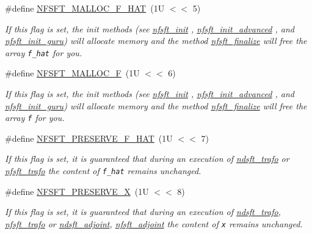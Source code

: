 \begin{CompactItemize}
\#define \hyperlink{group__nfsft_gb76dcf8db948f18cc87403dac804fc68}{NFSFT\_\-MALLOC\_\-F\_\-HAT}~(1U $<$$<$ 5)
\begin{CompactList}\small\item\em If this flag is set, the init methods (see \hyperlink{group__nfsft_g65cda3f4a3edc5eb39c697cf34b1f0b9}{nfsft\_\-init} , \hyperlink{group__nfsft_ge7dca3e41afdb39e8c518af414878c18}{nfsft\_\-init\_\-advanced} , and \hyperlink{group__nfsft_g60466ed37643b6b7b7c1638056604d2b}{nfsft\_\-init\_\-guru}) will allocate memory and the method \hyperlink{group__nfsft_ga63e193a27d84059742ff25ff81e2ed1}{nfsft\_\-finalize} will free the array {\tt f\_\-hat} for you. \item\end{CompactList}\item 
\#define \hyperlink{group__nfsft_gf3bc3ab774cda0c1c765e97066893d30}{NFSFT\_\-MALLOC\_\-F}~(1U $<$$<$ 6)
\begin{CompactList}\small\item\em If this flag is set, the init methods (see \hyperlink{group__nfsft_g65cda3f4a3edc5eb39c697cf34b1f0b9}{nfsft\_\-init} , \hyperlink{group__nfsft_ge7dca3e41afdb39e8c518af414878c18}{nfsft\_\-init\_\-advanced} , and \hyperlink{group__nfsft_g60466ed37643b6b7b7c1638056604d2b}{nfsft\_\-init\_\-guru}) will allocate memory and the method \hyperlink{group__nfsft_ga63e193a27d84059742ff25ff81e2ed1}{nfsft\_\-finalize} will free the array {\tt f} for you. \item\end{CompactList}\item 
\#define \hyperlink{group__nfsft_gc8a292845f0bdec6b0d8ef6eb693a00e}{NFSFT\_\-PRESERVE\_\-F\_\-HAT}~(1U $<$$<$ 7)
\begin{CompactList}\small\item\em If this flag is set, it is guaranteed that during an execution of \hyperlink{group__nfsft_gc1bcdf551a0bf1b4a5890b87e583caf8}{ndsft\_\-trafo} or \hyperlink{group__nfsft_g5796fc68c432d46dfcab7abd8c56ee22}{nfsft\_\-trafo} the content of {\tt f\_\-hat} remains unchanged. \item\end{CompactList}\item 
\#define \hyperlink{group__nfsft_gcf7d73753b74dbf148167c3d46226f09}{NFSFT\_\-PRESERVE\_\-X}~(1U $<$$<$ 8)
\begin{CompactList}\small\item\em If this flag is set, it is guaranteed that during an execution of \hyperlink{group__nfsft_gc1bcdf551a0bf1b4a5890b87e583caf8}{ndsft\_\-trafo}, \hyperlink{group__nfsft_g5796fc68c432d46dfcab7abd8c56ee22}{nfsft\_\-trafo} or \hyperlink{group__nfsft_g88c7be3ead1c726a1d5b8b903952c527}{ndsft\_\-adjoint}, \hyperlink{group__nfsft_g813bb48d404c7286310733c99a81a169}{nfsft\_\-adjoint} the content of {\tt x} remains unchanged. \item\end{CompactList}\item 

\end{CompactItemize}
